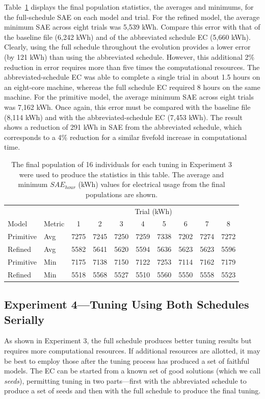 \documentclass[preprint, review, 12pt]{elsarticle}
\begin{document}
Table~\ref{tab:hourly-full} displays the final population statistics, the averages and minimums, for the full-schedule SAE on each model and trial. For the refined model, the average minimum SAE across eight trials was 5,539 kWh. Compare this error with that of the baseline file (6,242 kWh) and of the abbreviated schedule EC (5,660 kWh). Clearly, using the full schedule throughout the evolution provides a lower error (by 121 kWh) than using the abbreviated schedule. However, this additional 2\% reduction in error requires more than five times the computational resources. The abbreviated-schedule EC was able to complete a single trial in about 1.5 hours on an eight-core machine, whereas the full schedule EC required 8 hours on the same machine. For the primitive model, the average minimum SAE across eight trials was 7,162 kWh. Once again, this error must be compared with the baseline file (8,114 kWh) and with the abbreviated-schedule EC (7,453 kWh). The result shows a reduction of 291 kWh in SAE from the abbreviated schedule, which corresponds to a 4\% reduction for a similar fivefold increase in computational time.

\begin{table}[htbp]
\centering
\caption{The final population of 16 individuals for each tuning in Experiment 3 were used to produce the statistics in this table. The average and minimum $SAE_{hour}$ (kWh) values for electrical usage from the final populations are shown.}
\label{tab:hourly-full}
\begin{tabular}{llcccccccc}
\toprule
 &  & \multicolumn{8}{c}{Trial (kWh)}\\
Model & Metric & 1 & 2 & 3 & 4 & 5 & 6 & 7 & 8\\
\midrule
Primitive & Avg & 7275 & 7245 & 7250 & 7259 & 7338 & 7202 & 7274 & 7272\\\rowcolor{DarkRow}
Refined   & Avg & 5582 & 5641 & 5620 & 5594 & 5636 & 5623 & 5623 & 5596\\
Primitive & Min & 7175 & 7138 & 7150 & 7122 & 7253 & 7114 & 7162 & 7179\\\rowcolor{DarkRow}
Refined   & Min & 5518 & 5568 & 5527 & 5510 & 5560 & 5550 & 5558 & 5523\\
\bottomrule
\end{tabular}
\end{table}



\subsection{Experiment 4---Tuning Using Both Schedules Serially}
\label{sub:experiment4}
As shown in Experiment 3, the full schedule produces better tuning results but requires more computational resources. If additional resources are allotted, it may be best to employ those after the tuning process has produced a set of faithful models. The EC can be started from a known set of good solutions (which we call \emph{seeds}), permitting tuning in two parts---first with the abbreviated schedule to produce a set of seeds and then with the full schedule to produce the final tuning.
\end{document}
